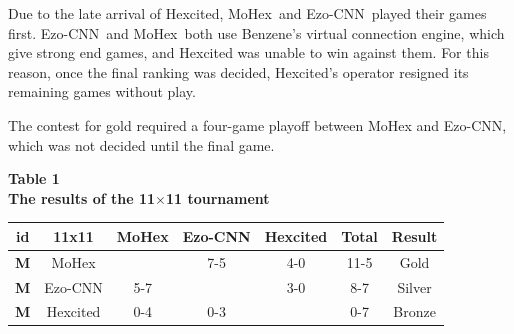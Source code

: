 \documentclass{icga}
\newif\iflong\longtrue  %
\def\Ec{\mbox{\sc Ezo-CNN}}
\def\Hite{\mbox{\sc Hexcited}}
\def\Mx{\mbox{\sc MoHex}}
\begin{document}
Due to the late arrival of \Hite,
\Mx\ and \Ec\ played their games first.
\Ec\ and \Mx\ both use Benzene's virtual connection engine,
which give strong end games, and \Hite{} was unable to win against them.
For this reason, once the final ranking was decided,
\Hite's operator resigned its remaining games without play.

The contest for gold required a four-game playoff between \Mx{} and \Ec{},
which was not decided until the final game.

\begin{center}
{\bf
Table 1 \\
The results of the 11$\times$11 tournament
}

\begin{tabular}{|c|c|c|c|c|c|c|}
\hline {\bf id} & {\bf 11x11} &\Mx{} &\Ec{}  & \Hite{}  
                & {\bf Total} & {\bf Result} \\ 
\hline {\bf M} & \Mx{}         &      &  7-5  &  4-0   & 11-5  &  Gold \\
\hline {\bf M} & \Ec{}         &  5-7 &       &  3-0   & 8-7   &  Silver \\
\hline {\bf M} & \Hite{}       &  0-4 &  0-3  &        & 0-7   &  Bronze \\
\hline
\end{tabular}
\end{center}

\iflong

\end{document}
